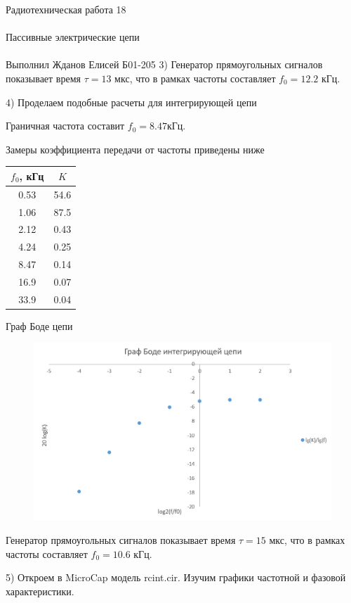 \documentclass{astroedu-lab}
\begin{document}
\begin{problem}{\huge Радиотехническая работа 18\\\\Пассивные электрические цепи\\\\Выполнил Жданов Елисей Б01-205}
3) Генератор прямоугольных сигналов показывает время $\tau = 13$ мкс, что в рамках частоты составляет $f_0 = 12.2$ кГц.

4) Проделаем подобные расчеты для интегрирующей цепи

Граничная частота составит $f_0 = 8.47 кГц$.

Замеры коэффициента передачи от частоты приведены ниже

\begin{center}
\begin{tabular}{|c|c|}
\hline 
$f_0$, кГц & $K$ \\
\hline
0.53 & 54.6 \\
1.06 & 87.5 \\
2.12 & 0.43 \\
4.24 & 0.25 \\ 
8.47 & 0.14 \\
16.9 & 0.07 \\
33.9 & 0.04 \\

\hline
\end{tabular}
\end{center}

\newpage

Граф Боде цепи

\begin{figure}[!h]
	\centering
	\includegraphics[width=1\textwidth]{1_3.png}
	\label{fig:boiler}
\end{figure}

Генератор прямоугольных сигналов показывает время $\tau = 15$ мкс, что в рамках частоты составляет $f_0 = 10.6$ кГц.

5) Откроем в MicroCap модель rcint.cir. Изучим графики частотной и фазовой характеристики.


\end{problem}
\end{document}
